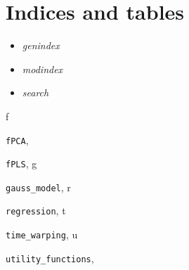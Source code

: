 \documentclass[letterpaper,10pt,english]{sphinxmanual}
\begin{document}
\chapter{Indices and tables}
\label{index:indices-and-tables}\begin{itemize}
\item {} 
\emph{genindex}

\item {} 
\emph{modindex}

\item {} 
\emph{search}

\end{itemize}


\renewcommand{\indexname}{Python Module Index}
\begin{theindex}
\def\bigletter#1{{\Large\sffamily#1}\nopagebreak\vspace{1mm}}
\bigletter{f}
\item {\texttt{fPCA}}, \pageref{fPCA:module-fPCA}
\item {\texttt{fPLS}}, \pageref{fPLS:module-fPLS}
\indexspace
\bigletter{g}
\item {\texttt{gauss\_model}}, \pageref{gauss_model:module-gauss_model}
\indexspace
\bigletter{r}
\item {\texttt{regression}}, \pageref{regression:module-regression}
\indexspace
\bigletter{t}
\item {\texttt{time\_warping}}, \pageref{time_warping:module-time_warping}
\indexspace
\bigletter{u}
\item {\texttt{utility\_functions}}, \pageref{utility_functions:module-utility_functions}
\end{theindex}

\renewcommand{\indexname}{Index}
\printindex
\end{document}
